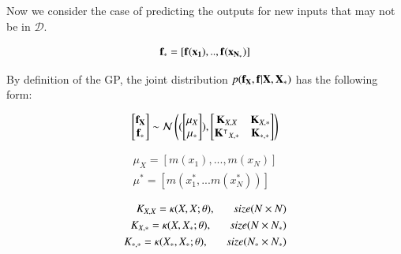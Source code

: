 \documentclass[]{elsarticle} %
\begin{document}
Now we consider the case of predicting the outputs for new inputs that
may not be in \(\mathcal{D}\).

\begin{equation}
\bf{f_{*}} = [f(x_1),.., f(x_{N_{*}})]
\label{eq:pred_fun}
\end{equation}

By definition of the GP, the joint distribution \(p(\bf{f_X},f|X,X_*)\)
has the following form:

\begin{equation}
\begin{bmatrix}  {\bf {f}_X}  \\  {{\bf f}_*} \end{bmatrix} \sim\mathcal{N} \begin{pmatrix} (\begin{bmatrix}  {{\bf \mu}_X}  \\  {{\bf \mu}_*} \end{bmatrix}),\begin{bmatrix} {{\bf K}_{X,X}}  & {{\bf
K}_{X,*}}  \\  {{\bf \mathbf{K}^\intercal}_{X,*}} & {{\bf K}_{*,*} } \end{bmatrix}\end{pmatrix}
\label{eq:gp_model}
\end{equation}

\begin{equation}
  \begin{split}
\mu_X = [m(x_1),...,m(x_N)] \\ 
\mu^\ast = [m(x^\ast_1,...m(x^\ast_N))]
  \end{split}
\label{eq:mu_val}
\end{equation}

\begin{equation}
 \begin{split}
K_{X,X} = {\Large \kappa} (X,X; \theta) , \; \; \; \; \; \ size (N \times  N) \\
K_{X,\ast} = {\Large \kappa} (X,X_\ast; \theta), \; \; \; \; \; \ size (N \times N_*) \\
K_{\ast,\ast} = {\Large \kappa} (X_\ast, X_\ast; \theta), \; \; \; \; \; \ size(N_\ast \times N_\ast)
 \end{split}
\label{eq:cov_sign}
\end{equation}
\end{document}
